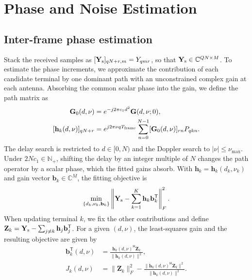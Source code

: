 \section{Phase and Noise Estimation}
\label{app:frontend}

\subsection{Inter-frame phase estimation}
Stack the received samples as
$[\mathbf Y_{\rm s}]_{qN+r,m}=Y_{qmr}$, so that
$\mathbf Y_{\rm s}\in\mathbb C^{QN\times M}$.
To estimate the phase increments, we approximate the contribution of each
candidate terminal by one dominant path with an unconstrained complex
gain at each antenna.
Absorbing the common scalar phase into the gain, we define the path matrix as
\begin{equation}
 \begin{aligned}
 \mathbf G_0(d,\nu)&=e^{-j2\pi c_1d^2}\mathbf G(d,\nu;0),\\
 [\mathbf h_k(d,\nu)]_{qN+r}
 &=e^{j2\pi\nu qT_{\rm frame}}
 \sum_{n=0}^{N-1}[\mathbf G_0(d,\nu)]_{rn}P_{qkn}.
 \end{aligned}
 \label{eq:phase-atom}
\end{equation}
The delay search is restricted to $d\in[0,N)$ and the Doppler search to $|\nu|\leq\nu_{\max}$. Under $2Nc_1\in\mathbb N_+$, shifting
the delay by an integer multiple of $N$ changes the path operator by
a scalar phase, which the fitted gains absorb. With
$\mathbf h_k=\mathbf h_k(d_k,\nu_k)$ and gain vector
$\mathbf b_k\in\mathbb C^M$, the fitting objective is
\begin{equation}
 \min_{\{d_k,\nu_k,\mathbf b_k\}}
 \left\|\mathbf Y_{\rm s}-\sum_{k=1}^K
 \mathbf h_k\mathbf b_k^{\mathsf T}\right\|_F^2.
 \label{eq:phase-fit}
\end{equation}
When updating terminal $k$, we fix the other contributions and define
$\mathbf Z_k=\mathbf Y_{\rm s}-\sum_{j\ne k}
\mathbf h_j\mathbf b_j^{\mathsf T}$. For a given $(d,\nu)$, the
least-squares gain and the resulting objective are given by
\begin{equation}
 \begin{aligned}
 \mathbf b_k^{\mathsf T}(d,\nu)
 &=\frac{\mathbf h_k(d,\nu)^{\mathsf H}\mathbf Z_k}
 {\|\mathbf h_k(d,\nu)\|^2},\\
 J_k(d,\nu)&=\|\mathbf Z_k\|_F^2-
 \frac{\|\mathbf h_k(d,\nu)^{\mathsf H}\mathbf Z_k\|^2}
 {\|\mathbf h_k(d,\nu)\|^2}.
 \end{aligned}
 \label{eq:phase-variable-projection}
\end{equation}
